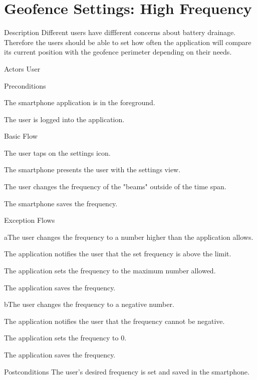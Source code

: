 \section{Geofence Settings: High Frequency}

%
\begin{cpart}{Description}
Different users have diffferent concerns about battery drainage. Therefore the users should be able to set how often the application will compare its current position with the geofence perimeter depending on their needs.
\end{cpart}


%
\begin{cpart}{Actors}
User
\end{cpart}

%
\begin{cpartList}{Preconditions}
\item The smartphone application is in the foreground.
\item The user is logged into the application.
\end{cpartList}

%
\begin{cpartList}{Basic Flow}
  \item The user taps on the settings icon.
  \item The smartphone presents the user with the settings view.
  \item The user changes the frequency of the "beams" outside of the time span.
  \item The smartphone saves the frequency.
\end{cpartList}

%
\begin{cpartList}{Exception Flows}
  \begin{innerList}{3}{a}{The user changes the frequency to a number higher than the application allows.}
    \item The application notifies the user that the set frequency is above the limit.
    \item The application sets the frequency to the maximum number allowed.
    \item The application saves the frequency.
  \end{innerList}
  \begin{innerList}{3}{b}{The user changes the frequency to a negative number.}
    \item The application notifies the user that the frequency cannot be negative.
    \item The application sets the frequency to 0.
    \item The application saves the frequency.
  \end{innerList}
\end{cpartList}

%
\begin{cpart}{Postconditions}
The user's desired frequency is set and saved in the smartphone.
\end{cpart}

\clearpage
